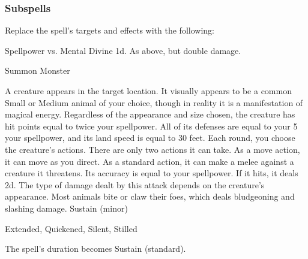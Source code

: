 \subsubsection{Subspells}
Replace the spell's targets and effects with the following:
\begin{spellcontent}
\begin{augmenttargetinginfo}
\end{augmenttargetinginfo}
\begin{augmenteffects}
\begin{spellattack}{Spellpower vs. Mental}
\spellsuccess Divine  \minus1d.
\spellcritical As above, but double damage.
\end{spellattack}
\end{augmenteffects}
\end{spellcontent}
\begin{spellsection}{Summon Monster}
\begin{spellheader}
\end{spellheader}
\begin{spellcontent}
\begin{spelltargetinginfo}
\end{spelltargetinginfo}
\begin{spelleffects}
\spelleffect
A creature appears in the target location.
It visually appears to be a common Small or Medium animal of your choice, though in reality it is a manifestation of magical energy.
Regardless of the appearance and size chosen, the creature has hit points equal to twice your spellpower.
All of its defenses are equal to your 5 \add your spellpower, and its land speed is equal to 30 feet.
Each round, you choose the creature's actions.
There are only two actions it can take.
As a move action, it can move as you direct.
As a standard action, it can make a melee  against a creature it threatens.
Its accuracy is equal to your spellpower.
If it hits, it deals  \minus2d.
The type of damage dealt by this attack depends on the creature's appearance.
Most animals bite or claw their foes, which deals bludgeoning and slashing damage.
\spelldur Sustain (minor)
\end{spelleffects}
\end{spellcontent}
\begin{spellfooter}
 Extended, Quickened, Silent, Stilled
\end{spellfooter}
\begin{spellsubcontent}
\begin{spellcantrip}
The spell's duration becomes Sustain (standard).
\end{spellcantrip}
\end{spellsubcontent}
\end{spellsection}
